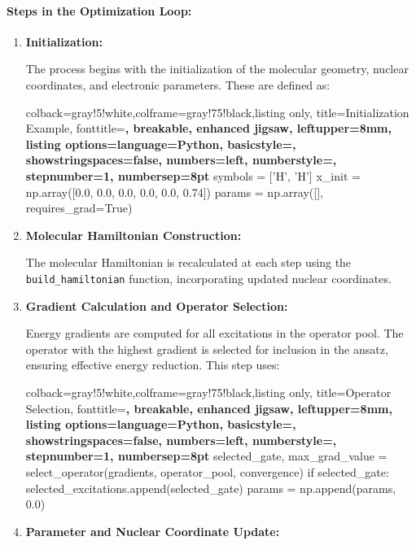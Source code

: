 \paragraph{Steps in the Optimization Loop:}
\begin{enumerate}
    \item \textbf{Initialization:}
    
    The process begins with the initialization of the molecular geometry, nuclear coordinates, and electronic parameters. These are defined as:
    
    \begin{tcblisting}{colback=gray!5!white,colframe=gray!75!black,listing only,
      title=Initialization Example, fonttitle=\bfseries, breakable, enhanced jigsaw, leftupper=8mm,
      listing options={language=Python, basicstyle=\ttfamily\small,
      showstringspaces=false, numbers=left, numberstyle=\footnotesize, stepnumber=1, numbersep=8pt}}
symbols = ['H', 'H']
x_init = np.array([0.0, 0.0, 0.0, 0.0, 0.0, 0.74])
params = np.array([], requires_grad=True)
    \end{tcblisting}

    \item \textbf{Molecular Hamiltonian Construction:}
    
    The molecular Hamiltonian is recalculated at each step using the \texttt{build\_hamiltonian} function, incorporating updated nuclear coordinates.

    \item \textbf{Gradient Calculation and Operator Selection:}
    
    Energy gradients are computed for all excitations in the operator pool. The operator with the highest gradient is selected for inclusion in the ansatz, ensuring effective energy reduction. This step uses:
    \begin{tcblisting}{colback=gray!5!white,colframe=gray!75!black,listing only,
      title=Operator Selection, fonttitle=\bfseries, breakable, enhanced jigsaw, leftupper=8mm,
      listing options={language=Python, basicstyle=\ttfamily\small,
      showstringspaces=false, numbers=left, numberstyle=\footnotesize, stepnumber=1, numbersep=8pt}}
selected_gate, max_grad_value = select_operator(gradients, operator_pool, convergence)
if selected_gate:
    selected_excitations.append(selected_gate)
    params = np.append(params, 0.0)
    \end{tcblisting}
    
    \item \textbf{Parameter and Nuclear Coordinate Update:}
    

\end{enumerate}
